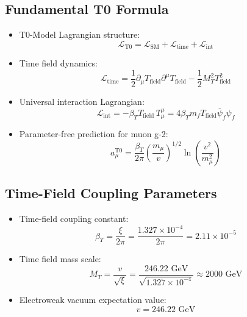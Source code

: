 \documentclass[12pt,a4paper]{article}
\begin{document}
\subsection{Fundamental T0 Formula}
\begin{itemize}
	\item T0-Model Lagrangian structure:
	$$\mathcal{L}_{\text{T0}} = \mathcal{L}_{\text{SM}} + \mathcal{L}_{\text{time}} + \mathcal{L}_{\text{int}}$$
	
	\item Time field dynamics:
	$$\mathcal{L}_{\text{time}} = \frac{1}{2}\partial_\mu T_{\text{field}} \partial^\mu T_{\text{field}} - \frac{1}{2}M_T^2 T_{\text{field}}^2$$
	
	\item Universal interaction Lagrangian:
	$$\mathcal{L}_{\text{int}} = -\beta_T T_{\text{field}} \, T^\mu_\mu = 4\beta_T m_f T_{\text{field}} \bar{\psi}_f \psi_f$$
	
	\item Parameter-free prediction for muon g-2:
	$$\boxed{a_\mu^{\text{T0}} = \frac{\beta_T}{2\pi} \left(\frac{m_\mu}{v}\right)^{1/2} \ln\left(\frac{v^2}{m_\mu^2}\right)}$$
\end{itemize}

\subsection{Time-Field Coupling Parameters}
\begin{itemize}
	\item Time-field coupling constant:
	$$\beta_T = \frac{\xi}{2\pi} = \frac{1.327 \times 10^{-4}}{2\pi} = 2.11 \times 10^{-5}$$
	
	\item Time field mass scale:
	$$M_T = \frac{v}{\sqrt{\xi}} = \frac{246.22 \text{ GeV}}{\sqrt{1.327 \times 10^{-4}}} \approx 2000 \text{ GeV}$$
	
	\item Electroweak vacuum expectation value:
	$$v = 246.22 \text{ GeV}$$
\end{itemize}
\end{document}
